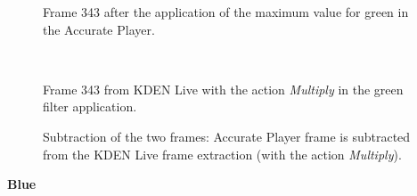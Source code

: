 \documentclass[../MasterThesis.tex]{subfiles}
\begin{document}
\begin{minipage}{0.48\textwidth}
	\begin{figure}[H]
		\begin{center}
			\caption[Frame 343 after the application of the green filter in the Accurate Player.]{Frame 343 after the application of the maximum value for green in the Accurate Player.}
		\end{center}
	\end{figure}
\end{minipage}\begin{minipage}{0.04\textwidth}
	\ 
\end{minipage}\begin{minipage}{0.48\textwidth}
	\begin{figure}[H]
		\begin{center}
			\caption[Frame 343 from KDEN Live with the action \textit{Multiply}.]{Frame 343 from KDEN Live with the action \textit{Multiply} in the green filter application.}
		\end{center}
	\end{figure}
\end{minipage}

\vspace*{-1em}

\begin{figure}[H]
	\begin{center}
		\caption[Subtraction of KDEN Live (\textit{Multiply} and Accurate Player).]{Subtraction of the two frames: Accurate Player frame is subtracted from the KDEN Live frame extraction (with the action \textit{Multiply}).}
	\end{center}
\end{figure}


\vspace*{-1em}

\textbf{Blue}

\vspace*{-1em}
\end{document}
